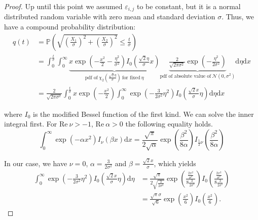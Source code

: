 \documentclass[a4paper,12pt]{article}
\theoremstyle{plain}
\theoremstyle{definition}
\begin{document}
\begin{proof}
	Up until this point we assumed $\varepsilon_{i, j}$ to be constant, but it is a normal distributed random variable with zero mean and standard deviation $\sigma$. Thus, we have a compound probability distribution:
	\begin{align*}
		q(t) &= \mathbb{P}\left( \sqrt{\left( \frac{X_1}{\sigma} \right)^2 + \left( \frac{X_2}{\sigma} \right)^2} \leq \frac{t}{\sigma} \right) \\
		&= \int_0^\frac{t}{\sigma} \int_0^\infty \underbrace{x \exp \left( - \frac{x^2}{2} - \frac{\eta^2}{\sigma^2} \right) I_0 \left( \frac{\sqrt{2} \eta}{\sigma} x \right)}_{\textrm{pdf of} \ \chi_2 \left( \frac{\sqrt{2} \eta}{\sigma} \right) \ \textrm{for fixed} \ \eta} \underbrace{\frac{2}{\sqrt{2 \pi \sigma^2}} \exp \left( - \frac{\eta^2}{2 \sigma^2} \right)}_{\textrm{pdf of absolute value of} \ \mathcal{N}(0, \sigma^2)} \mathrm{d}\eta \mathrm{d}x \\
		&= \frac{2}{\sqrt{2 \pi \sigma^2}} \int_0^\frac{t}{\sigma} x \exp \left( - \frac{x^2}{2} \right) \int_0^\infty \exp \left( - \frac{3}{2 \sigma^2} \eta^2 \right) I_0 \left( \frac{\sqrt{2} x}{\sigma} \eta \right) \mathrm{d}\eta \mathrm{d}x
	\end{align*}
	
	where $I_0$ is the modified Bessel function of the first kind. We can solve the inner integral first. For $\mathrm{Re} \ \nu > -1$, $\mathrm{Re} \ \alpha > 0$ the following equality holds\cite{TISP}.
	\begin{equation}\label{eq: intbessel}
		\int_0^\infty \exp \left( - \alpha x^2 \right) I_\nu ( \beta x ) \mathrm{d}x = \frac{\sqrt{\pi}}{2 \sqrt{\alpha}} \exp \left( \frac{\beta^2}{8 \alpha} \right) I_{\frac{1}{2} \nu} \left( \frac{\beta^2}{8 \alpha} \right)
	\end{equation}
	
	In our case, we have $\nu = 0$, $\alpha = \frac{3}{2 \sigma^2}$ and $\beta = \frac{\sqrt{2} x}{\sigma}$, which yields
	\begin{align*}
		\int_0^\infty \exp \left( - \frac{3}{2 \sigma^2} \eta^2 \right) I_0 \left( \frac{\sqrt{2} x}{\sigma} \eta \right) \mathrm{d}\eta &= \frac{\sqrt{\pi}}{2 \sqrt{\frac{3}{2 \sigma^2}}} \exp \left( \frac{\frac{2 x^2}{\sigma^2}}{8 \frac{3}{2 \sigma^2}} \right) I_0 \left( \frac{\frac{2 x^2}{\sigma^2}}{8 \frac{3}{2 \sigma^2}} \right) \\
		&= \frac{\sqrt{\pi} \sigma}{\sqrt{6}} \exp \left( \frac{x^2}{6} \right) I_0 \left( \frac{x^2}{6} \right).
	\end{align*}
	

\end{proof}
\end{document}
